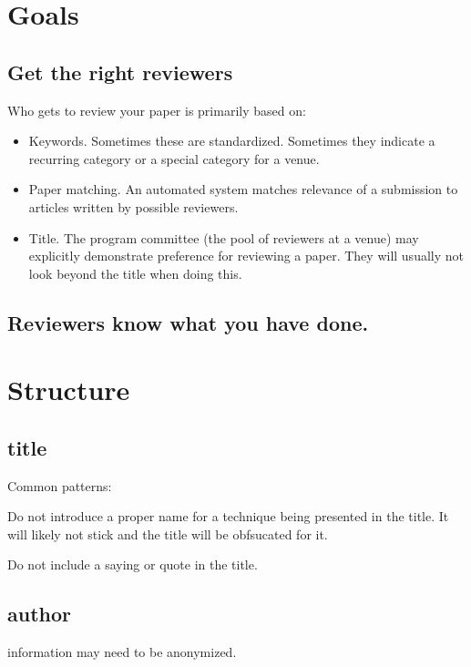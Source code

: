 \section{Goals}

\subsection{Get the right reviewers}

Who gets to review your paper is primarily based on:
\begin{itemize}

\item{} Keywords. Sometimes these are standardized. Sometimes they indicate a recurring category or
  a special category for a venue.

\item{} Paper matching. An automated system matches relevance of a submission to articles written
  by possible reviewers.

\item{} Title. The program committee (the pool of reviewers at a venue) may explicitly demonstrate
  preference for reviewing a paper. They will usually not look beyond the title when doing this.
\end{itemize}

\subsection{Reviewers know what you have done.}

\section{Structure}

\subsection{title}

  Common patterns:

  Do not introduce a proper name for a technique being presented in the title. It will likely not
  stick and the title will be obfsucated for it.

  Do not include a saying or quote in the title.

\subsection{author} information may need to be anonymized.

